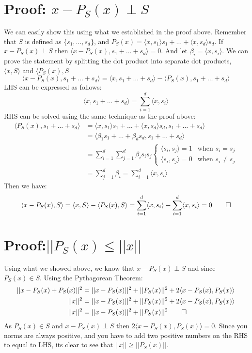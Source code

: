 \documentclass[12pt,twoside]{article}
\begin{document}
\section*{Proof: $x - P_S(x) \perp S$}
We can easily show this using what we established in the proof above. Remember that $S$ is defined as $\{s_1, \dots, s_d\}$, and $P_S(x) = \langle x, s_1 \rangle s_1 + \dots + \langle x, s_d \rangle s_d$. If $x - P_S(x) \perp S$ then $\langle x - P_S(x), s_1 + \dots + s_d \rangle =0$. And let $\beta_i = \langle x, s_i \rangle$. We can prove the statement by splitting the dot product into separate dot products, $\langle x, S \rangle$ and $\langle P_S(x), S$
$$
\langle x - P_S(x), s_1 + \dots + s_d \rangle = \langle x,s_1 + \dots + s_d \rangle - \langle P_S(x) ,  s_1 + \dots + s_d \rangle
$$
LHS can be expressed as follows:
$$
\langle x,s_1 + \dots + s_d \rangle = \sum_{i=1}^d \langle x, s_i \rangle 
$$
RHS can be solved using the same technique as the proof above:
\begin{equation}
    \begin{split}
        \langle P_S(x) ,  s_1 + \dots + s_d \rangle &= \langle x, s_1 \rangle s_1 + \dots + \langle x, s_d \rangle s_d ,  s_1 + \dots + s_d \rangle \\
        &= \langle \beta_1 s_1 + \dots + \beta_d s_d, s_1 + \dots + s_d \rangle \\
        &= \sum_{i=1}^d \sum_{j=1}^d \beta_i s_i s_j 
        \begin{cases} \langle s_i, s_j \rangle = 1 & \text{when } s_i = s_j \\
        \langle s_i, s_j \rangle = 0 & \text{when } s_i \neq s_j\end{cases} \\
        &= \sum_{j=1}^d \beta_i = \sum_{i=1}^d \langle x, s_i \rangle 
    \end{split}
\end{equation}
Then we have:
$$
    \langle x - P_S(x), S \rangle = \langle x, S \rangle - \langle P_S(x), S \rangle = \sum_{i=1}^d \langle x, s_i \rangle - \sum_{i=1}^d \langle x, s_i \rangle = 0 \qed
$$
\section*{Proof:$||P_S(x) \leq ||x||$} 
Using what we showed above, we know that $x-P_S(x) \perp S$ and since $P_S(x) \in S$. Using the Pythagorean Theorem:
\begin{equation}
    \begin{split}
       ||x-P_S(x)+P_S(x)||^2 &= ||x-P_S(x)||^2 + ||P_S(x)||^2 + 2\langle x-P_S(x), P_S(x) \rangle \\
       ||x||^2 &= ||x-P_S(x)||^2 + ||P_S(x)||^2 + 2\langle x-P_S(x), P_S(x) \rangle \\
       ||x||^2 &= ||x-P_S(x)||^2 + ||P_S(x)||^2 \qed
     \end{split}
\end{equation}
As $P_S(x) \in S$ and $x-P_S(x) \perp S$ then $2\langle x-P_S(x), P_S(x) \rangle=0$. Since you norms are always positive, and you have to add two positive numbers on the RHS to equal to LHS, its clear to see that $||x|| \geq ||P_S(x)||$.
\end{document}
